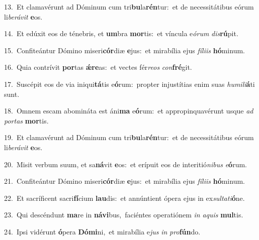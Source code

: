 {\numbfont\textcolor{\numbcolor}{13.}}~Et clamavérunt ad Dóminum cum tri\-\textbf{bu}\-la\-\textbf{rén}\-tur:~\star et de necessitátibus eórum li\-\textit{be}\-\textit{rá}\textit{vit} \textbf{e}\-os.\par
{\numbfont\textcolor{\numbcolor}{14.}}~Et edúxit eos de ténebris, et \textbf{um}\-bra \textbf{mor}\-tis:~\star et víncula e\-\textit{ó}\-\textit{rum} \textit{dis}\-\textbf{rú}pit.\par
{\numbfont\textcolor{\numbcolor}{15.}}~Confiteántur Dómino miseri\-\textbf{cór}\-diæ \textbf{e}\-jus:~\star et mirabília ejus \textit{fí}\-\textit{li}\textit{is} \textbf{hó}\-minum.\par
{\numbfont\textcolor{\numbcolor}{16.}}~Quia contrívit \textbf{por}\-tas \textbf{ǽ}\-\textbf{re}as:~\star et vectes fér\-\textit{re}\-\textit{os} \textit{con}\-\textbf{fré}git.\par
{\numbfont\textcolor{\numbcolor}{17.}}~Suscépit eos de via iniqui\-\textbf{tá}\-tis e\-\textbf{ó}\-rum:~\star propter injustítias enim suas \textit{hu}\-\textit{mi}\textit{li}\textbf{á}ti sunt.\par
{\numbfont\textcolor{\numbcolor}{18.}}~Omnem escam abomináta est áni\textbf{ma} e\-\textbf{ó}\-rum:~\star et appropinquavérunt usque \textit{ad} \textit{por}\-\textit{tas} \textbf{mor}\-tis.\par
{\numbfont\textcolor{\numbcolor}{19.}}~Et clamavérunt ad Dóminum cum tri\-\textbf{bu}\-la\-\textbf{rén}\-tur:~\star et de necessitátibus eórum li\-\textit{be}\-\textit{rá}\textit{vit} \textbf{e}\-os.\par
{\numbfont\textcolor{\numbcolor}{20.}}~Misit verbum suum, et sa\-\textbf{ná}\-vit \textbf{e}\-os:~\star et erípuit eos de interitió\-\textit{ni}\-\textit{bus} \textit{e}\-\textbf{ó}rum.\par
{\numbfont\textcolor{\numbcolor}{21.}}~Confiteántur Dómino miseri\-\textbf{cór}\-diæ \textbf{e}\-jus:~\star et mirabília ejus \textit{fí}\-\textit{li}\textit{is} \textbf{hó}\-minum.\par
{\numbfont\textcolor{\numbcolor}{22.}}~Et sacríficent sacri\-\textbf{fí}\-cium \textbf{lau}\-dis:~\star et annúntient ópera ejus in ex\-\textit{sul}\-\textit{ta}\textit{ti}\textbf{ó}ne.\par
{\numbfont\textcolor{\numbcolor}{23.}}~Qui descéndunt \textbf{ma}\-re in \textbf{ná}\-\textbf{vi}bus,~\star faciéntes operatiónem \textit{in} \textit{a}\-\textit{quis} \textbf{mul}\-tis.\par
{\numbfont\textcolor{\numbcolor}{24.}}~Ipsi vidérunt \textbf{ó}\-pera \textbf{Dó}\-\textbf{mi}ni,~\star et mirabília e\textit{jus} \textit{in} \textit{pro}\-\textbf{fún}do.\par
